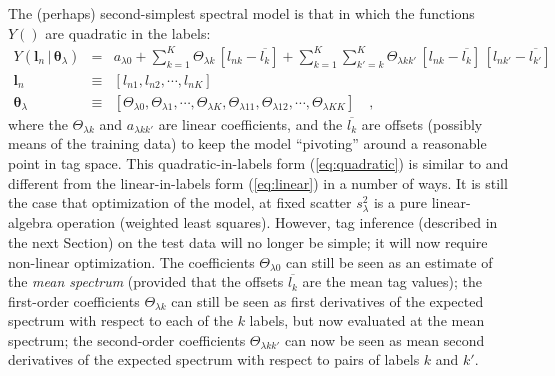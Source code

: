 \documentclass[12pt, preprint]{aastex}
\newcommand{\set}[1]{\bm{#1}}
\newcommand{\mean}[1]{\overline{#1}}
\newcommand{\given}{\,|\,}
\begin{document}
The (perhaps) second-simplest spectral model is that in which the
functions $Y()$ are quadratic in the labels:
\begin{eqnarray}
Y(\set{l}_n\given\set{\theta}_\lambda) &=&
 a_{\lambda 0} + \sum_{k=1}^K \Theta_{\lambda k}\,[l_{nk} - \mean{l_k}]
 + \sum_{k=1}^K \sum_{k'=k}^K \Theta_{\lambda kk'}\,[l_{nk} - \mean{l_k}]\,[l_{nk'} - \mean{l_{k'}}]
\label{eq:quadratic}\\
\set{l}_n &\equiv& [l_{n1}, l_{n2}, \cdots, l_{nK}]
\\
\set{\theta}_\lambda &\equiv& [\Theta_{\lambda 0}, \Theta_{\lambda 1}, \cdots, \Theta_{\lambda K},
                            \Theta_{\lambda 11}, \Theta_{\lambda 12}, \cdots, \Theta_{\lambda KK}]
\quad ,
\end{eqnarray}
where the $\Theta_{\lambda k}$ and $a_{\lambda kk'}$ are linear coefficients, and
the $\mean{l_k}$ are offsets (possibly means of the training data) to
keep the model ``pivoting'' around a reasonable point in tag space.
This quadratic-in-labels form (\ref{eq:quadratic}) is similar to and
different from the linear-in-labels form (\ref{eq:linear}) in a number
of ways.
It is still the case that optimization of the model, at fixed scatter
$s_\lambda^2$ is a pure linear-algebra operation (weighted least
squares).
However, tag inference (described in the next Section) on the test
data will no longer be simple; it will now require non-linear
optimization.
The coefficients $\Theta_{\lambda 0}$ can still be seen as an estimate of the
\emph{mean spectrum} (provided that the offsets $\mean{l_k}$ are the
mean tag values); the first-order coefficients $\Theta_{\lambda k}$ can still
be seen as first derivatives of the expected spectrum with respect to
each of the $k$ labels, but now evaluated at the mean spectrum; the
second-order coefficients $\Theta_{\lambda kk'}$ can now be seen as mean
second derivatives of the expected spectrum with respect to pairs of
labels $k$ and $k'$.
\end{document}
